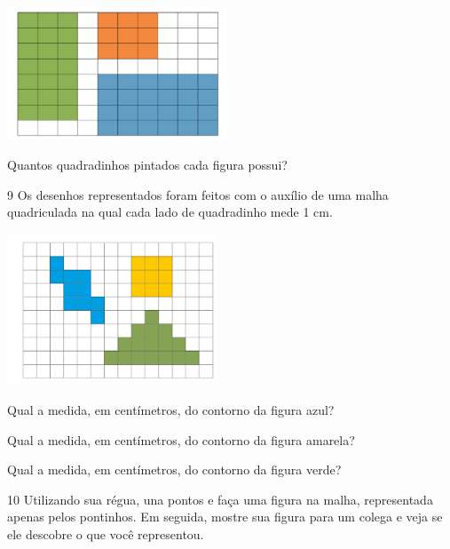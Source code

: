 \includegraphics[width=2.59189in,height=1.55847in]{./media/image56.png}

Quantos quadradinhos pintados cada figura possui?




\num{9} Os desenhos representados foram feitos com o auxílio de uma malha
quadriculada na qual cada lado de quadradinho mede 1 cm.


\includegraphics[width=2.47521in,height=1.77515in]{./media/image57.png}

\begin{escolha}
\item Qual a medida, em centímetros, do contorno da figura azul?

\reduline{18 cm\hfill}

\item Qual a medida, em centímetros, do contorno da figura amarela?

\reduline{12 cm\hfill}

\item Qual a medida, em centímetros, do contorno da figura verde?

\reduline{22 cm\hfill}
\end{escolha}

\num{10} Utilizando sua régua, una pontos e faça uma figura na malha, representada apenas pelos pontinhos. Em seguida, mostre sua
figura para um colega e veja se ele descobre o que você representou.

